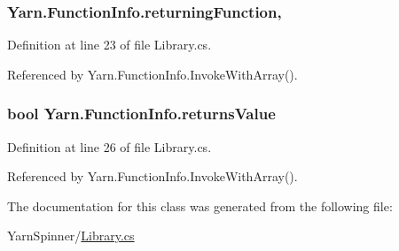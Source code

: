\hypertarget{a00096_a8b6e0e5a875c427a1d947f3c52c308ca}{
\subsubsection[{returning\-Function}]{ Yarn.\-Function\-Info.\-returning\-Function\hspace{0.3cm}{\ttfamily [get]}, {\ttfamily [set]}}}\label{a00096_a8b6e0e5a875c427a1d947f3c52c308ca}


Definition at line 23 of file Library.\-cs.



Referenced by Yarn.\-Function\-Info.\-Invoke\-With\-Array().

\hypertarget{a00096_acaff044276aa230de7c0b27dd5267bc7}{
\subsubsection[{returns\-Value}]{\setlength{\rightskip}{0pt plus 5cm}bool Yarn.\-Function\-Info.\-returns\-Value\hspace{0.3cm}{\ttfamily [get]}}}\label{a00096_acaff044276aa230de7c0b27dd5267bc7}


Definition at line 26 of file Library.\-cs.



Referenced by Yarn.\-Function\-Info.\-Invoke\-With\-Array().



The documentation for this class was generated from the following file\-:\begin{DoxyCompactItemize}
\item 
Yarn\-Spinner/\hyperlink{a00293}{Library.\-cs}\end{DoxyCompactItemize}
